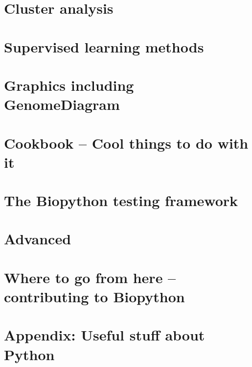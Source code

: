 \documentclass{report}
\begin{document}
\chapter{Cluster analysis}


\chapter{Supervised learning methods}


\chapter{Graphics including GenomeDiagram}
\label{chapter:graphics}


\chapter{Cookbook -- Cool things to do with it}
\label{chapter:cookbook}


\chapter{The Biopython testing framework}
\label{sec:regr_test}


\chapter{Advanced}
\label{chapter:advanced}


\chapter{Where to go from here -- contributing to Biopython}


\chapter{Appendix: Useful stuff about Python}
\label{sec:appendix}

\end{document}

